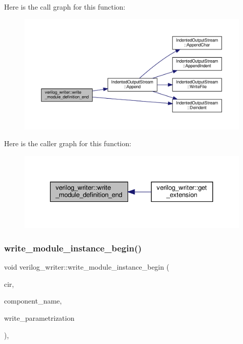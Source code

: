 Here is the call graph for this function\+:
\nopagebreak
\begin{figure}[H]
\begin{center}
\leavevmode
\includegraphics[width=350pt]{d8/dba/classverilog__writer_aeb32328c5b805c13c4fc86a5576e82d4_cgraph}
\end{center}
\end{figure}
Here is the caller graph for this function\+:
\nopagebreak
\begin{figure}[H]
\begin{center}
\leavevmode
\includegraphics[width=329pt]{d8/dba/classverilog__writer_aeb32328c5b805c13c4fc86a5576e82d4_icgraph}
\end{center}
\end{figure}
\mbox{\label{classverilog__writer_a1e0cb32347eba52c36780f6f179dfa6c}} 
\subsubsection{\texorpdfstring{write\+\_\+module\+\_\+instance\+\_\+begin()}{write\_module\_instance\_begin()}}
{\footnotesize\ttfamily void verilog\+\_\+writer\+::write\+\_\+module\+\_\+instance\+\_\+begin (\begin{DoxyParamCaption}\item[{const \hyperlink{structural__objects_8hpp_a8ea5f8cc50ab8f4c31e2751074ff60b2}{structural\+\_\+object\+Ref} \&}]{cir,  }\item[{const std\+::string \&}]{component\+\_\+name,  }\item[{bool}]{write\+\_\+parametrization }\end{DoxyParamCaption})\hspace{0.3cm}{\ttfamily [override]}, {\ttfamily [virtual]}}



